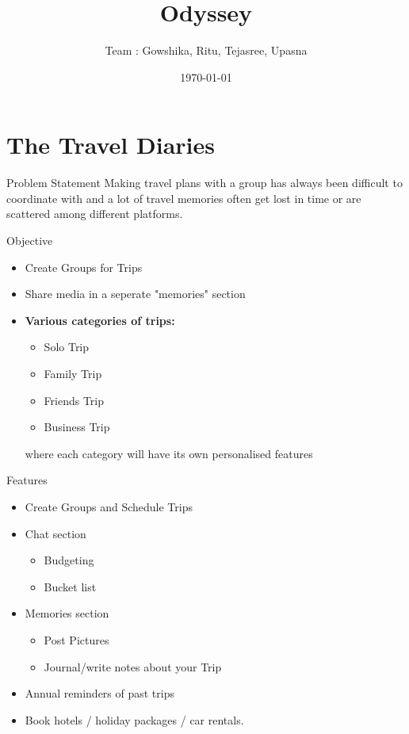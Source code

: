 \documentclass[14pt]{beamer}
\title{\textbf{Odyssey}}
\author{Team : Gowshika, Ritu, Tejasree, Upasna}
\date{\today}
\begin{document}
\maketitle 

\section{The Travel Diaries}
\begin{frame}{Problem Statement}
    Making travel plans with a group has always been difficult to coordinate with and
    \alert{a lot of travel memories often get lost} in time or are scattered among different platforms.                   
\end{frame}

\begin{frame}{Objective}
\begin{itemize}
     \item Create Groups for Trips
     \item Share media in a seperate "memories" section  
     \item \textbf{Various categories of trips:}
     \begin{itemize}
         \item \alert{Solo Trip}
         \item \alert{Family Trip }
         \item \alert{Friends Trip}
         \item \alert{Business Trip}
     \end{itemize}
     where each category will have its own personalised features
\end{itemize}    
\end{frame}

\begin{frame}{Features}
\begin{itemize} 
    \item Create Groups and Schedule Trips
    \item Chat section
    \begin{itemize}
        \item Budgeting
        \item Bucket list
    \end{itemize}
    \item Memories section
    \begin{itemize}
        \item Post Pictures
        \item Journal/write notes about your Trip
    \end{itemize}
    \item Annual reminders of past trips
    \item Book hotels / holiday packages / car
    rentals.
    
\end{itemize}  
\end{frame}
\end{document}

